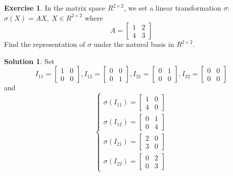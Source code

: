 \documentclass{article}
\theoremstyle{definition}
\newtheorem{exe}{Exercise}[section]
\newtheorem{sol}{Solution}[exe]
\begin{document}
\begin{exe}
    In the matrix space $R^{2\times2}$, we set a linear transformation $\sigma:$
    $\sigma(X)=AX,\ X\in R^{2\times2}$
    where
    $$
    A=\begin{bmatrix}
        1 & 2\\
        4 & 3
    \end{bmatrix}$$
    Find the representation of $\sigma$ under the natural basis in $R^{2\times2}$.
\end{exe}
\begin{sol}
    Set 
    $$I_{11}=\begin{bmatrix}
        1 & 0\\
        0 & 0
    \end{bmatrix},I_{12}=\begin{bmatrix}
        0 & 0\\
        0 & 1
    \end{bmatrix},I_{21}=\begin{bmatrix}
        0 & 1\\
        0 & 0
    \end{bmatrix},I_{22}=\begin{bmatrix}
        0 & 0\\
        0 & 0
    \end{bmatrix}$$
    and
    $$
    \begin{cases}
        \sigma(I_{11})=\begin{bmatrix}
                            1 & 0\\
                            4 & 0
                        \end{bmatrix}\\
        \sigma(I_{12})=\begin{bmatrix}
                            0 & 1\\
                            0 & 4
                        \end{bmatrix}\\
        \sigma(I_{21})=\begin{bmatrix}
                            2 & 0\\
                            3 & 0
                        \end{bmatrix}\\
        \sigma(I_{22})=\begin{bmatrix}
                            0 & 2\\
                            0 & 3
                        \end{bmatrix}

\end{cases}$$
\end{sol}
\end{document}
